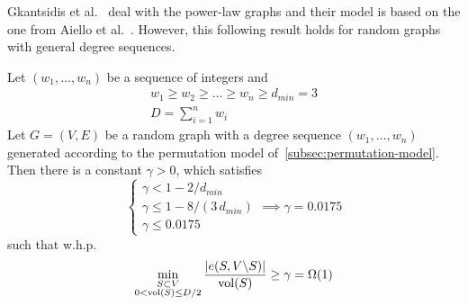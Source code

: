 Gkantsidis et al.~\cite{gms03} deal with the power-law graphs
and their model is based on the one from Aiello et al.~\cite{acl01}.
However, this following result holds for random graphs with general degree sequences.

\begin{theorem}
    \label{thm:gms}
    Let $(w_1,\ldots,w_n)$ be a sequence of integers and
    \begin{gather}
        w_1\geq w_2\geq \ldots\geq w_n\geq d_{min}=3\\
        D=\sum_{i=1}^{n}{w_i} %
    \end{gather}
    Let $G=(V,E)$ be a random graph with a degree sequence $(w_1,\ldots,w_n)$
    generated according to the permutation model of~\autoref{subsec:permutation-model}.
    Then there is a constant $\gamma>0$, which satisfies
    \begin{equation}
        \begin{cases}
            \gamma<1-2/d_{min}\\
            \gamma\leq1-8/(3\,d_{min})\\
            \gamma\leq 0.0175
        \end{cases}\implies
        \gamma=0.0175
    \end{equation}
    such that w.h.p.
    \begin{equation}
        \min_{\substack{S\subset V\\0<\operatorname*{vol}(S)\leq D/2}}
        \frac{|e(S,V\backslash S)|}{\operatorname*{vol}(S)}\geq\gamma=\Omega(1)
    \end{equation}
\end{theorem}

